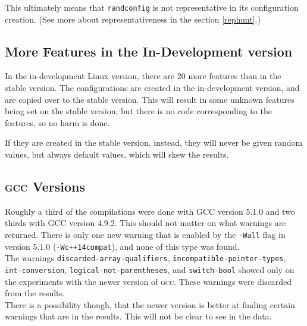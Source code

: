 \documentclass[a4paper,11pt]{report}
\begin{document}
This ultimately means that \texttt{randconfig} is not representative in its 
configuration creation. (See more about representativeness in the section 
\ref{rephunt}.)
\\




            \subsection*{More Features in the In-Development version}
In the in-development Linux version, there are 20 more features than in the 
stable version. The configurations are created in the in-development version, 
and are copied over to the stable version. This will result in some unknown 
features being set on the stable version, but there is no code corresponding to 
the features, so no harm is done.

If they are created in the stable version, instead, they will never be given 
random values, but always default values, which will skew the results.
\\


            \subsection*{\textsc{gcc} Versions}
Roughly a third of the compilations were done with GCC version 5.1.0 and two 
thirds with GCC version 4.9.2. This should not matter on what warnings are 
returned. There is only one new warning that is enabled by the \texttt{-Wall} 
flag in version 5.1.0 (\texttt{-Wc++14compat}), and none of this type was found.
\\

The warnings \texttt{discarded-array-qualifiers}, 
\texttt{incompatible-pointer-types}, \texttt{int-conversion}, 
\texttt{logical-not-parentheses}, and \texttt{switch-bool} showed only on the 
experiments with the newer version of \textsc{gcc}. These warnings were 
discarded from the results.
\\

There is a possibility though, that the newer version is better at finding 
certain warnings that are in the results. This will not be clear to see in the 
data.







            \newpage
\end{document}
